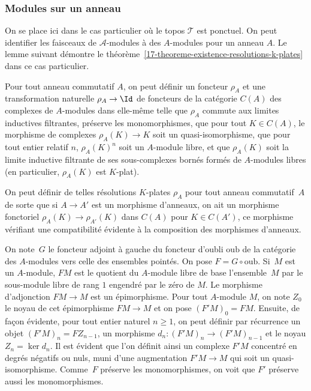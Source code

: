 \documentclass[10pt]{../fichiers-configuration-latex/smfart}
\begin{document}
\subsubsection{Modules sur un anneau}%

On se place ici dans le cas particulier où le topos $\mathscr T$ est
ponctuel. On peut identifier les faisceaux de $\mathscr A$-modules à des
$A$-modules pour un anneau $A$. Le lemme suivant
démontre le théorème~\ref{17-theoreme-existence-resolutions-k-plates} dans ce
cas particulier.

\begin{lemme3}\label{17-lemme-existence-resolutions-k-plates-topos-ponctuel}
Pour tout anneau commutatif $A$, on peut définir un foncteur $\rho_A$ et
une transformation naturelle $\rho_A\to\Id$ de foncteurs de la
catégorie $C(A)$ des
complexes de $A$-modules dans elle-même telle que $\rho_A$ commute aux
limites inductives filtrantes, préserve les monomorphismes,
que pour tout $K\in C(A)$, le morphisme de
complexes $\rho_A(K)\to K$ soit un quasi-isomorphisme, que pour tout
entier relatif $n$, $\rho_A(K)^n$ soit un $A$-module libre, et que
$\rho_A(K)$ soit la limite inductive filtrante de ses sous-complexes
bornés formés de $A$-modules libres (en particulier, $\rho_A(K)$ est
$K$-plat).

On peut définir de telles résolutions $K$-plates $\rho_A$ pour tout anneau
commutatif $A$ de sorte que si $A\to A'$ est un morphisme d'anneaux, on ait
un morphisme fonctoriel $\rho_A(K)\to\rho_{A'}(K)$ dans $C(A)$ pour
$K\in C(A')$, ce morphisme vérifiant une compatibilité évidente
à la composition des morphismes d'anneaux.
\end{lemme3}

On note $G$ le foncteur adjoint à gauche du foncteur d'oubli $\mathrm{oub}$
de la catégorie des $A$-modules vers celle des ensembles pointés. On pose
$F=G\circ \mathrm{oub}$. Si $M$ est un $A$-module, $FM$ est le quotient du
$A$-module libre de base l'ensemble $M$ par le sous-module libre de rang
$1$ engendré par le zéro de $M$. Le morphisme d'adjonction $FM\to M$ est un
épimorphisme.
Pour tout
$A$-module $M$, on note $Z_0$ le noyau de cet épimorphisme $FM\to M$
et on pose $(F'M)_0=FM$.
Ensuite, de façon évidente, pour tout entier naturel $n\geq 1$,
on peut définir par récurrence un objet $(F'M)_n=FZ_{n-1}$,
un morphisme $d_n\colon (F'M)_n\to (F'M)_{n-1}$ et le noyau $Z_n=\ker d_n$.
Il est évident que l'on définit ainsi un complexe $F'M$ concentré en degrés
négatifs ou nuls, muni d'une augmentation $F'M\to M$ qui soit un
quasi-isomorphisme. Comme $F$ préserve les monomorphismes, on voit que $F'$
préserve aussi les monomorphismes.
\end{document}
